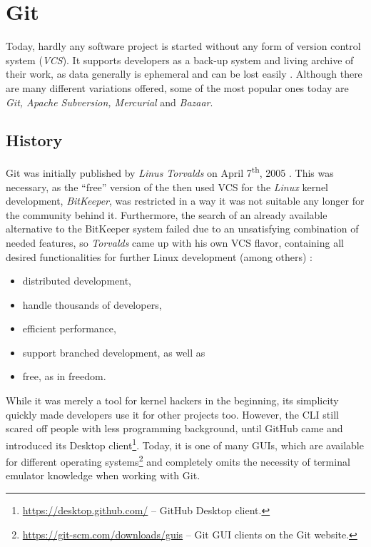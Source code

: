 \section{Git}
\label{sec:git}

Today, hardly any software project is started without any form of version control system (\emph{VCS}). It supports developers as a back-up system and living archive of their work, as data generally is ephemeral and can be lost easily \cite[1]{loeliger2012version}. Although there are many different variations offered, some of the most popular ones today are \emph{Git, Apache Subversion, Mercurial} and \emph{Bazaar}.

\subsection{History}
\label{sec:git-history}
Git was initially published by \emph{Linus Torvalds} on April 7\textsuperscript{th}, 2005 \cite[6]{loeliger2012version}. This was necessary, as the ``free'' version of the then used VCS for the \emph{Linux} kernel development, \emph{BitKeeper}, was restricted in a way it was not suitable any longer for the community behind it. Furthermore, the search of an already available alternative to the BitKeeper system failed due to an unsatisfying combination of needed features, so \emph{Torvalds} came up with his own VCS flavor, containing all desired functionalities for further Linux development (among others) \cite[4]{loeliger2012version}:

\begin{itemize}
  \item distributed development,
  \item handle thousands of developers,
  \item efficient performance,
  \item support branched development, as well as
  \item free, as in freedom.
\end{itemize}
While it was merely a tool for kernel hackers in the beginning, its simplicity quickly made developers use it for other projects too. However, the CLI still scared off people with less programming background, until GitHub came and introduced its Desktop client\footnote{\url{https://desktop.github.com/} -- GitHub Desktop client.}. Today, it is one of many GUIs, which are available for different operating systems\footnote{\url{https://git-scm.com/downloads/guis} -- Git GUI clients on the Git website.} and completely omits the necessity of terminal emulator knowledge when working with Git.

